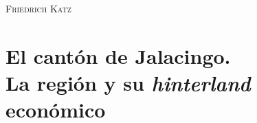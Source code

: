 \documentclass[14pt,twoside,final]{extbook} %
\begin{document}
\begin{flushright}
\begin{minipage}{8cm}
\begin{flushright}
\begin{minipage}{8cm}
\end{minipage}
\end{flushright}
\begin{flushright}
\textsc{Friedrich Katz}
\end{flushright}
\end{minipage}
\end{flushright}
\chapter[El cantón de Jalacingo. La región y su \emph{hinterland} económico]{El cantón de Jalacingo. \\ La región y su \emph{hinterland} económico}\label{ch:capitulo-uno}
\thispagestyle{empty}
\pagestyle{fancy}
\fancyhf{} %
\fancyhead[RO,LE]{\iffloatpage{}{\thepage}}
\renewcommand\headrulewidth{\iffloatpage{0pt}{0pt}}
\setcounter{page}{31}
\end{document}
